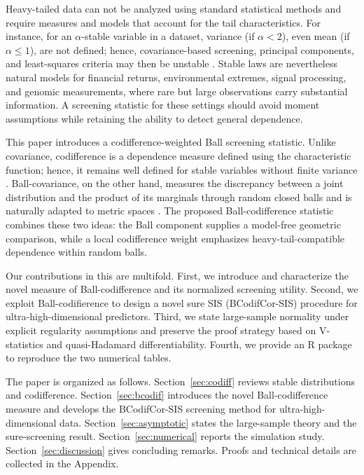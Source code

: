\documentclass[11pt]{article}
\theoremstyle{definition}
\begin{document}
Heavy-tailed data can not be analyzed using standard statistical methods and require measures and models that account for the tail characteristics.  For instance, for an \(\alpha\)-stable variable in a dataset, variance (if \( \alpha<2\)), even mean (if \(\alpha\leq 1\)), are not defined; hence, covariance-based screening, principal components, and least-squares criteria may then be unstable \citep{maroufy2025measure}.  Stable laws are nevertheless natural models for financial returns, environmental extremes, signal processing, and genomic measurements, where rare but large observations carry substantial information.  A screening statistic for these settings should avoid moment assumptions while retaining the ability to detect general dependence.


This paper introduces a codifference-weighted Ball screening statistic.  Unlike covariance, codifference is a dependence measure defined using the characteristic function; hence, it remains well defined for stable variables without finite variance \citep{Kokoszka:Taqqu:1993,Samorodnitsky:Taqqu:1994}.  Ball-covariance, on the other hand, measures the discrepancy between a joint distribution and the product of its marginals through random closed balls and is naturally adapted to metric spaces \citep{Pan:2019}.  The proposed Ball-codifference statistic combines these two ideas: the Ball component supplies a model-free geometric comparison, while a local codifference weight emphasizes heavy-tail-compatible dependence within random balls.

Our contributions in this are multifold.  First, we introduce and characterize the novel measure of Ball-codifference and its normalized screening utility.  Second, we exploit Ball-codifierence to design a novel sure SIS (BCodifCor-SIS) procedure for ultra-high-dimensional predictors.  Third, we state large-sample normality under explicit regularity assumptions and preserve the proof strategy based on V-statistics and quasi-Hadamard differentiability.  Fourth, we provide an R package to reproduce the two numerical tables. %

The paper is organized as follows.  Section~\ref{sec:codiff} reviews stable distributions and codifference.  Section~\ref{sec:bcodif} introduces the novel Ball-codifference measure and develops the BCodifCor-SIS screening method for ultra-high-dimensional data.  Section~\ref{sec:asymptotic} states the large-sample theory and the sure-screening result.  Section~\ref{sec:numerical} reports the simulation study.  Section~\ref{sec:discussion} gives concluding remarks.  Proofs and technical details are collected in the Appendix.
\end{document}
